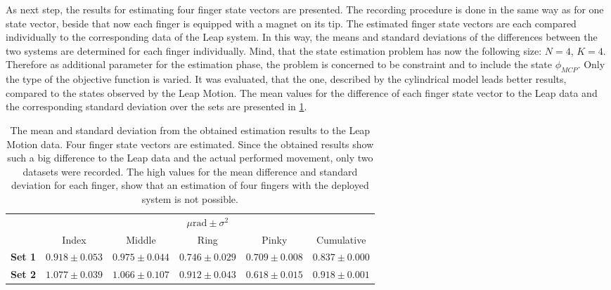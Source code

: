 As next step, the results for estimating four finger state vectors are presented. The recording procedure is done in the same way as for one state vector, beside that now each finger is equipped with a magnet on its tip. The estimated finger state vectors are each compared individually to the corresponding data of the Leap system. In this way, the means and standard deviations of the differences between the two systems are determined for each finger individually. Mind, that the state estimation problem has now the following size: $ N = 4 $, $ K = 4 $. Therefore as additional parameter for the estimation phase, the problem is concerned to be constraint and to include the state $ \phi_{MCP} $. Only the type of the objective function is varied. It was evaluated, that the one, described by the cylindrical model leads better results, compared to the states observed by the Leap Motion. The mean values for the difference of each finger state vector to the Leap data and the corresponding standard deviation over the sets are presented in \ref{tab:estSetFour}.\\
\begin{table}[!htb]
\centering
\begin{tabular}{l c c c c c}
\toprule
&  \multicolumn{5}{c}{$ \mu \si{\radian} \pm \sigma^{2} $} \\ \cmidrule{2-6}
& 			   				 Index 				 & Middle 			   & Ring 				 & Pinky 			   &  Cumulative \\ \midrule
\textbf{Set 1} &  $ 0.918 \pm 0.053 $ & $ 0.975 \pm 0.044 $ & $ 0.746 \pm 0.029 $ & $ 0.709 \pm 0.008 $ & $ 0.837 \pm 0.000 $ \\ 
\textbf{Set 2} &  $ 1.077 \pm 0.039 $ & $ 1.066 \pm 0.107 $ & $ 0.912 \pm 0.043 $ & $ 0.618 \pm 0.015 $ & $ 0.918 \pm 0.001 $ \\ \bottomrule
\end{tabular}
\caption[Difference of estimated states, compared to Leap Motion data for four finger estimation]
{The mean and standard deviation from the obtained estimation results to the Leap Motion data. Four finger state vectors are estimated. Since the obtained results show such a big difference to the Leap data and the actual performed movement, only two datasets were recorded. The high values for the mean difference and standard deviation for each finger, show that an estimation of four fingers with the deployed system is not possible.}
\label{tab:estSetFour}
\end{table}
